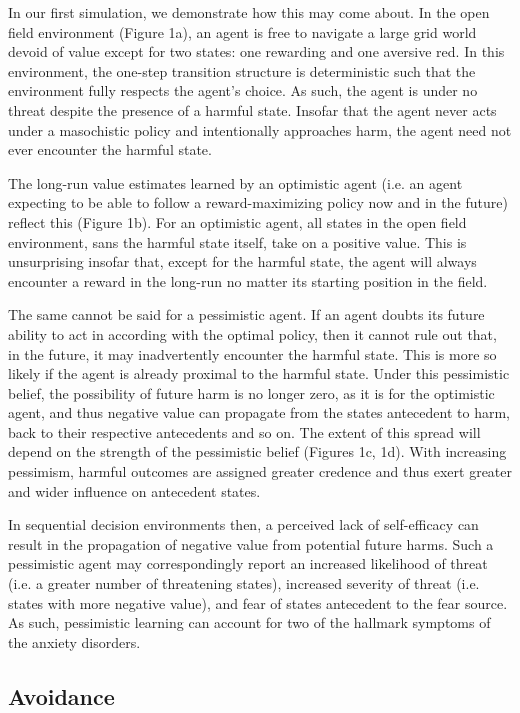 \documentclass[11pt]{article} %
\begin{document}
In our first simulation, we demonstrate how this may come about. In the open field environment (Figure 1a), an agent is free to navigate a large grid world devoid of value except for two states: one rewarding and one aversive red. In this environment, the one-step transition structure is deterministic such that the environment fully respects the agent's choice. As such, the agent is under no threat despite the presence of a harmful state. Insofar that the agent never acts under a masochistic policy and intentionally approaches harm, the agent need not ever encounter the harmful state.

The long-run value estimates learned by an optimistic agent (i.e. an agent expecting to be able to follow a reward-maximizing policy now and in the future) reflect this (Figure 1b). For an optimistic agent, all states in the open field environment, sans the harmful state itself, take on a positive value. This is unsurprising insofar that, except for the harmful state, the agent will always encounter a reward in the long-run no matter its starting position in the field.

The same cannot be said for a pessimistic agent. If an agent doubts its future ability to act in according with the optimal policy, then it cannot rule out that, in the future, it may inadvertently encounter the harmful state. This is more so likely if the agent is already proximal to the harmful state. Under this pessimistic belief, the possibility of future harm is no longer zero, as it is for the optimistic agent, and thus negative value can propagate from the states antecedent to harm, back to their respective antecedents and so on. The extent of this spread will depend on the strength of the pessimistic belief (Figures 1c, 1d). With increasing pessimism, harmful outcomes are assigned greater credence and thus exert greater and wider influence on antecedent states.

In sequential decision environments then, a perceived lack of self-efficacy can result in the propagation of negative value from potential future harms. Such a pessimistic agent may correspondingly report an increased likelihood of threat (i.e. a greater number of threatening states), increased severity of threat (i.e. states with more negative value), and fear of states antecedent to the fear source. As such, pessimistic learning can account for two of the hallmark symptoms of the anxiety disorders.

\subsection{Avoidance}
\end{document}
